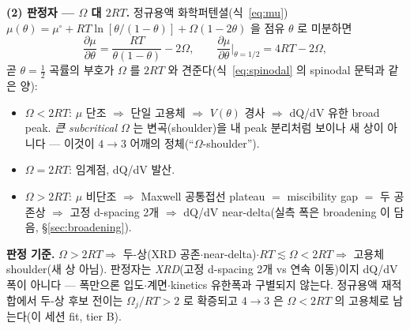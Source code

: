 \textbf{(2) 판정자 --- $\Omega$ 대 $2RT$.} 정규용액 화학퍼텐셜(식~\eqref{eq:mu})
$\mu(\theta)=\mu^\circ+RT\ln[\theta/(1-\theta)]+\Omega(1-2\theta)$ 을 점유 $\theta$ 로 미분하면
\begin{equation}
\frac{\partial\mu}{\partial\theta}=\frac{RT}{\theta(1-\theta)}-2\Omega,
\qquad
\frac{\partial\mu}{\partial\theta}\Big|_{\theta=1/2}=4RT-2\Omega,
\label{eq:gr2l-crit}
\end{equation}
곧 $\theta{=}\tfrac12$ 곡률의 부호가 $\Omega$ 를 $2RT$ 와 견준다(식~\eqref{eq:spinodal} 의 spinodal 문턱과 같은 양):
\begin{itemize}[leftmargin=1.4em,itemsep=1pt]
\item $\Omega<2RT$: $\mu$ 단조 $\Rightarrow$ 단일 고용체 $\Rightarrow$ $V(\theta)$ 경사 $\Rightarrow$ dQ/dV 유한 broad
peak. \emph{큰 subcritical $\Omega$} 는 변곡(shoulder)을 내 peak 분리처럼 보이나 새 상이 아니다 --- 이것이
$4\!\to\!3$ 어깨의 정체(``$\Omega$-shoulder'').
\item $\Omega=2RT$: 임계점, dQ/dV 발산.
\item $\Omega>2RT$: $\mu$ 비단조 $\Rightarrow$ Maxwell 공통접선 plateau $=$ miscibility gap $=$ 두 공존상
$\Rightarrow$ 고정 d-spacing 2개 $\Rightarrow$ dQ/dV near-delta(실측 폭은 broadening 이 담음, \S\ref{sec:broadening}).
\end{itemize}
\begin{keybox}
\textbf{판정 기준.} $\Omega>2RT\Rightarrow$ 두-상(XRD 공존$\cdot$near-delta)$\cdot$$RT\!\lesssim\!\Omega<2RT\Rightarrow$
고용체 shoulder(새 상 아님). 판정자는 \emph{XRD}(고정 d-spacing 2개 vs 연속 이동)이지 dQ/dV 폭이 아니다 --- 폭만으론
입도$\cdot$계면$\cdot$kinetics 유한폭과 구별되지 않는다. 정규용액 재적합에서 두-상 후보 전이는 $\Omega_j/RT>2$ 로
확증되고 $4\!\to\!3$ 은 $\Omega<2RT$ 의 고용체로 남는다(이 세션 fit, tier B).
\end{keybox}

